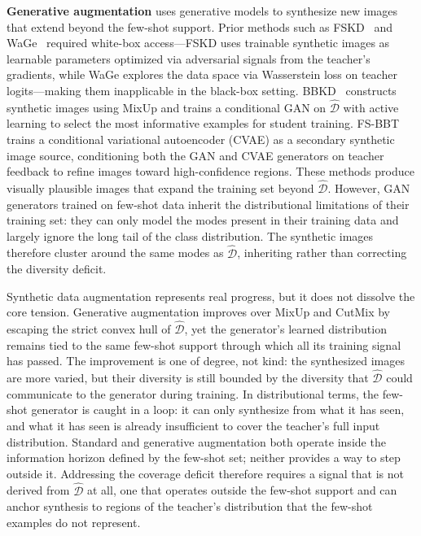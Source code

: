 \documentclass[12pt, a4paper, twoside]{book}
\numberwithin{equation}{chapter}
\theoremstyle{plain}
\theoremstyle{definition}
\theoremstyle{remark}
\newenvironment{foldable}{}{}
\begin{document}
\begin{foldable}
  \textbf{Generative augmentation} uses generative models to synthesize new images that extend beyond the few-shot support.
  Prior methods such as FSKD~\cite{kimura2018few} and WaGe~\cite{kong2020learning} required white-box access---FSKD uses trainable synthetic images as learnable parameters optimized via adversarial signals from the teacher's gradients, while WaGe explores the data space via Wasserstein loss on teacher logits---making them inapplicable in the black-box setting.
  BBKD~\cite{wang2020neural} constructs synthetic images using MixUp and trains a conditional GAN on $\hat{\mathcal{D}}$ with active learning to select the most informative examples for student training.
  FS-BBT~\cite{nguyen2022black} trains a conditional variational autoencoder (CVAE) as a secondary synthetic image source, conditioning both the GAN and CVAE generators on teacher feedback to refine images toward high-confidence regions.
  These methods produce visually plausible images that expand the training set beyond $\hat{\mathcal{D}}$.
  However, GAN generators trained on few-shot data inherit the distributional limitations of their training set: they can only model the modes present in their training data and largely ignore the long tail of the class distribution.
  The synthetic images therefore cluster around the same modes as $\hat{\mathcal{D}}$, inheriting rather than correcting the diversity deficit.
\end{foldable}

\begin{foldable}
  Synthetic data augmentation represents real progress, but it does not dissolve the core tension.
  Generative augmentation improves over MixUp and CutMix by escaping the strict convex hull of $\hat{\mathcal{D}}$, yet the generator's learned distribution remains tied to the same few-shot support through which all its training signal has passed.
  The improvement is one of degree, not kind: the synthesized images are more varied, but their diversity is still bounded by the diversity that $\hat{\mathcal{D}}$ could communicate to the generator during training.
  In distributional terms, the few-shot generator is caught in a loop: it can only synthesize from what it has seen, and what it has seen is already insufficient to cover the teacher's full input distribution.
  Standard and generative augmentation both operate inside the information horizon defined by the few-shot set; neither provides a way to step outside it.
  Addressing the coverage deficit therefore requires a signal that is not derived from $\hat{\mathcal{D}}$ at all, one that operates outside the few-shot support and can anchor synthesis to regions of the teacher's distribution that the few-shot examples do not represent.
\end{foldable}
\end{document}
